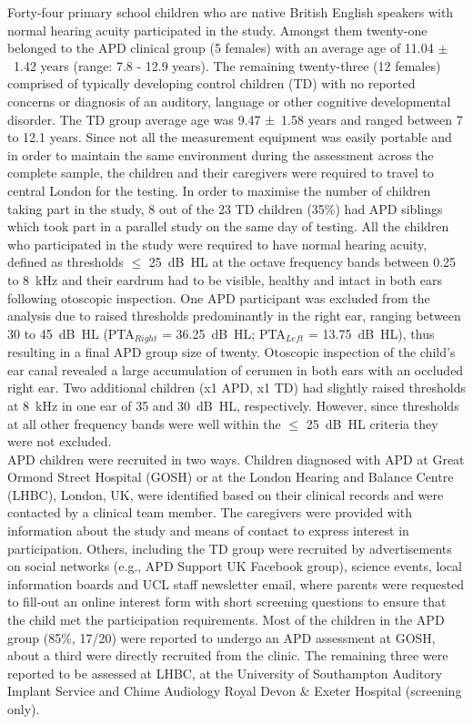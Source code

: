 \documentclass[a4paper, twoside]{templates/ociamthesis}
\begin{document}
Forty-four primary school children who are native British English speakers with normal hearing acuity participated in the study. Amongst them twenty-one belonged to the APD clinical group (5 females) with an average age of 11.04 \(\pm\)~1.42 years (range: 7.8 - 12.9 years). The remaining twenty-three (12 females) comprised of typically developing control children (TD) with no reported concerns or diagnosis of an auditory, language or other cognitive developmental disorder. The TD group average age was 9.47 ±~1.58 years and ranged between 7 to 12.1 years. Since not all the measurement equipment was easily portable and in order to maintain the same environment during the assessment across the complete sample, the children and their caregivers were required to travel to central London for the testing. In order to maximise the number of children taking part in the study, 8 out of the 23 TD children (35\%) had APD siblings which took part in a parallel study on the same day of testing. All the children who participated in the study were required to have normal hearing acuity, defined as thresholds \(\leq\) 25~dB~HL at the octave frequency bands between 0.25 to 8~kHz and their eardrum had to be visible, healthy and intact in both ears following otoscopic inspection. One APD participant was excluded from the analysis due to raised thresholds predominantly in the right ear, ranging between 30 to 45~dB~HL (PTA\(_{Right}\) = 36.25~dB~HL; PTA\(_{Left}\) = 13.75~dB~HL), thus resulting in a final APD group size of twenty. Otoscopic inspection of the child's ear canal revealed a large accumulation of cerumen in both ears with an occluded right ear. Two additional children (x1 APD, x1 TD) had slightly raised thresholds at 8~kHz in one ear of 35 and 30~dB~HL, respectively. However, since thresholds at all other frequency bands were well within the \(\leq\) 25~dB~HL criteria they were not excluded.\\

APD children were recruited in two ways. Children diagnosed with APD at Great Ormond Street Hospital (GOSH) or at the London Hearing and Balance Centre (LHBC), London, UK, were identified based on their clinical records and were contacted by a clinical team member. The caregivers were provided with information about the study and means of contact to express interest in participation. Others, including the TD group were recruited by advertisements on social networks (e.g., APD Support UK Facebook group), science events, local information boards and UCL staff newsletter email, where parents were requested to fill-out an online interest form with short screening questions to ensure that the child met the participation requirements. Most of the children in the APD group (85\%, 17/20) were reported to undergo an APD assessment at GOSH, about a third were directly recruited from the clinic. The remaining three were reported to be assessed at LHBC, at the University of Southampton Auditory Implant Service and Chime Audiology Royal Devon \& Exeter Hospital (screening only).\\
\end{document}
